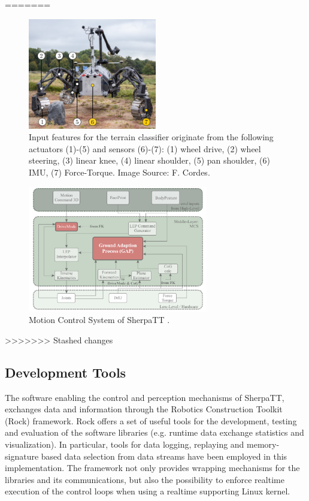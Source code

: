 \documentclass{article}
\begin{document}
=======
\begin{figure}[h]
\centering
\includegraphics[width=0.5\textwidth]{../figures/terrain_classifier_sensor_inputs.png}
\caption{\label{fig:SensorInputs}Input features for the terrain classifier originate from the following actuators (1)-(5) and sensors (6)-(7): (1) wheel drive, (2) wheel steering, (3) linear knee, (4) linear shoulder, (5) pan shoulder, (6) IMU, (7) Force-Torque. Image Source: F. Cordes.}
\end{figure}

\begin{figure}[h]
\centering
\includegraphics[width=0.7\textwidth]{../figures/MCS-Structure.pdf}
\caption{\label{fig:MCS}Motion Control System of SherpaTT \cite{cordes_phd_2018}.}
\end{figure}




>>>>>>> Stashed changes

\subsection{Development Tools}

The software enabling the control and perception mechanisms of SherpaTT, exchanges data and information through the Robotics Construction Toolkit (Rock) framework. Rock offers a set of useful tools for the development, testing and evaluation of the software libraries (e.g. runtime data exchange statistics and visualization). In particular, tools for data logging, replaying and memory-signature based data selection from data streams have been employed in this implementation. The framework not only provides wrapping mechanisms for the libraries and its communications, but also the possibility to enforce realtime execution of the control loops when using a realtime supporting Linux kernel. 
\end{document}
